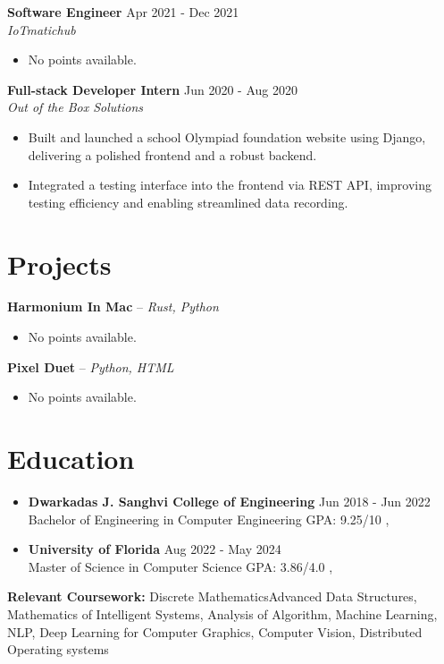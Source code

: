 \documentclass[a4paper,10pt]{article}
\begin{document}
\vspace{-6pt}
\textbf{Software Engineer} \hfill Apr 2021 - Dec 2021 \\
\textit{IoTmatichub}
\begin{itemize}
\item No points available.
\end{itemize}
\vspace{-6pt}
\textbf{Full-stack Developer Intern} \hfill Jun 2020 - Aug 2020 \\
\textit{Out of the Box Solutions}
\begin{itemize}
\item Built and launched a school Olympiad foundation website using Django, delivering a polished frontend and a robust backend.
\item Integrated a testing interface into the frontend via REST API, improving testing efficiency and enabling streamlined data recording.
\end{itemize}


\vspace{-8pt}
\section*{Projects}
\vspace{-3pt}
\textbf{Harmonium In Mac} -- \textit{Rust, Python}
\begin{itemize}
    \item No points available.
\end{itemize}
\vspace{0pt}
\textbf{Pixel Duet} -- \textit{Python, HTML}
\begin{itemize}
    \item No points available.
\end{itemize}


\vspace{-8pt}
\section*{Education}
\vspace{-3pt}
\begin{itemize}
    \item \textbf{Dwarkadas J. Sanghvi College of Engineering} \hfill Jun 2018 - Jun 2022 \\
Bachelor of Engineering in Computer Engineering \textbar{} GPA: 9.25/10 \hfill , 
\vspace{4pt}
\item \textbf{University of Florida} \hfill Aug 2022 - May 2024 \\
Master of Science in Computer Science \textbar{} GPA: 3.86/4.0 \hfill , 

\end{itemize}
\vspace{-3pt}
{\small\textbf{Relevant Coursework:} Discrete MathematicsAdvanced Data Structures, Mathematics of Intelligent Systems, Analysis of Algorithm, Machine Learning, NLP, Deep Learning for Computer Graphics, Computer Vision, Distributed Operating systems}
\end{document}
